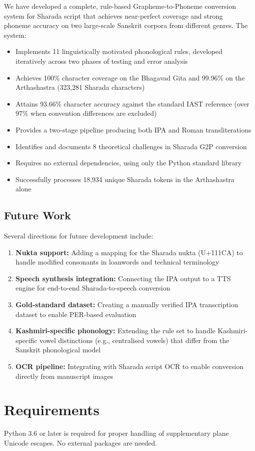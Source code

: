 \documentclass[11pt]{article}
\begin{document}
We have developed a complete, rule-based Grapheme-to-Phoneme conversion system for Sharada script that achieves near-perfect coverage and strong phoneme accuracy on two large-scale Sanskrit corpora from different genres. The system:

\begin{itemize}
    \item Implements 11 linguistically motivated phonological rules, developed iteratively across two phases of testing and error analysis
    \item Achieves 100\% character coverage on the Bhagavad Gita and 99.96\% on the Arthashastra (323,281 Sharada characters)
    \item Attains 93.66\% character accuracy against the standard IAST reference (over 97\% when convention differences are excluded)
    \item Provides a two-stage pipeline producing both IPA and Roman transliterations
    \item Identifies and documents 8 theoretical challenges in Sharada G2P conversion
    \item Requires no external dependencies, using only the Python standard library
    \item Successfully processes 18,934 unique Sharada tokens in the Arthashastra alone
\end{itemize}

\subsection{Future Work}
Several directions for future development include:
\begin{enumerate}
    \item \textbf{Nukta support:} Adding a mapping for the Sharada nukta (U+111CA) to handle modified consonants in loanwords and technical terminology
    \item \textbf{Speech synthesis integration:} Connecting the IPA output to a TTS engine for end-to-end Sharada-to-speech conversion
    \item \textbf{Gold-standard dataset:} Creating a manually verified IPA transcription dataset to enable PER-based evaluation
    \item \textbf{Kashmiri-specific phonology:} Extending the rule set to handle Kashmiri-specific vowel distinctions (e.g., centralised vowels) that differ from the Sanskrit phonological model
    \item \textbf{OCR pipeline:} Integrating with Sharada script OCR to enable conversion directly from manuscript images
\end{enumerate}

\section*{Requirements}
Python 3.6 or later is required for proper handling of supplementary plane Unicode escapes. No external packages are needed.
\end{document}
